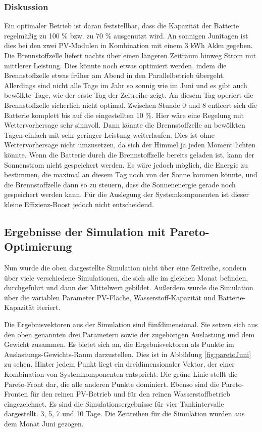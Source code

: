 \subsubsection{Diskussion}
Ein optimaler Betrieb ist daran feststellbar, dass die Kapazität der Batterie regelmäßig zu 100 \% bzw. zu 70 \% ausgenutzt wird. An sonnigen Junitagen ist dies bei den zwei PV-Modulen in Kombination mit einem 3 kWh Akku gegeben. Die Brennstoffzelle liefert nachts über einen längeren Zeitraum hinweg Strom mit mittlerer Leistung. Dies könnte noch etwas optimiert werden, indem die Brennstoffzelle etwas früher am Abend in den Parallelbetrieb übergeht. Allerdings sind nicht alle Tage im Jahr so sonnig wie im Juni und es gibt auch bewölkte Tage, wie der erste Tag der Zeitreihe zeigt. An diesem Tag operiert die Brennstoffzelle sicherlich nicht optimal. Zwischen Stunde 0 und 8 entleert sich die Batterie komplett bis auf die eingestellten 10 \%. Hier wäre eine Regelung mit Wettervorhersage sehr sinnvoll. Dann könnte die Brennstoffzelle an bewölkten Tagen einfach mit sehr geringer Leistung weiterlaufen. Dies ist ohne Wettervorhersage nicht umzusetzen, da sich der Himmel ja jeden Moment lichten könnte. Wenn die Batterie durch die Brennstoffzelle bereits geladen ist, kann der Sonnenstrom nicht gespeichert werden. Es wäre jedoch möglich, die Energie zu bestimmen, die maximal an diesem Tag noch von der Sonne kommen könnte, und die Brennstoffzelle dann so zu steuern, dass die Sonnenenergie gerade noch gespeichert werden kann. Für die Auslegung der Systemkomponenten ist dieser kleine Effizienz-Boost jedoch nicht entscheidend.

\subsection{Ergebnisse der Simulation mit Pareto-Optimierung}
Nun wurde die oben dargestellte Simulation nicht über eine Zeitreihe, sondern über viele verschiedene Simulationen, die sich alle im gleichen Monat befinden, durchgeführt und dann der Mittelwert gebildet. Außerdem wurde die Simulation über die variablen Parameter PV-Fläche, Wasserstoff-Kapazität und Batterie-Kapazität iteriert.

Die Ergebnisvektoren aus der Simulation sind fünfdimensional. Sie setzen sich aus den oben genannten drei Parametern sowie der zugehörigen Auslastung und dem Gewicht zusammen. Es bietet sich an, die Ergebnisvektoren als Punkte im Auslastungs-Gewichts-Raum darzustellen. Dies ist in Abbildung \ref{fig:paretoJuni} zu sehen. Hinter jedem Punkt liegt ein dreidimensionaler Vektor, der einer Kombination von Systemkomponenten entspricht. Die grüne Linie stellt die Pareto-Front dar, die alle anderen Punkte dominiert. Ebenso sind die Pareto-Fronten für den reinen PV-Betrieb und für den reinen Wasserstoffbetrieb eingezeichnet. Es sind die Simulationsergebnisse für vier Tankintervalle dargestellt. 3, 5, 7 und 10 Tage. Die Zeitreihen für die Simulation wurden aus dem Monat Juni gezogen.



